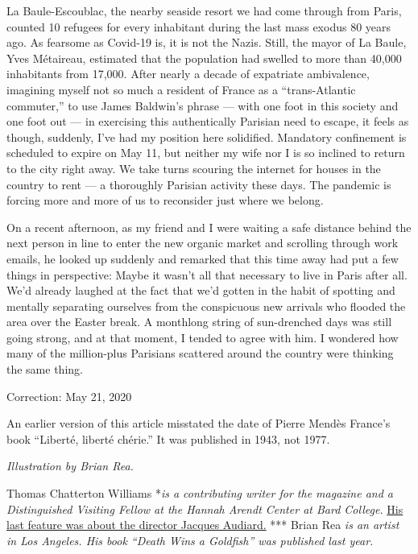 La Baule-Escoublac, the nearby seaside resort we had come through from
Paris, counted 10 refugees for every inhabitant during the last mass
exodus 80 years ago. As fearsome as Covid-19 is, it is not the Nazis.
Still, the mayor of La Baule, Yves Métaireau, estimated that the
population had swelled to more than 40,000 inhabitants from 17,000.
After nearly a decade of expatriate ambivalence, imagining myself not so
much a resident of France as a ``trans-Atlantic commuter,'' to use James
Baldwin's phrase --- with one foot in this society and one foot out ---
in exercising this authentically Parisian need to escape, it feels as
though, suddenly, I've had my position here solidified. Mandatory
confinement is scheduled to expire on May 11, but neither my wife nor I
is so inclined to return to the city right away. We take turns scouring
the internet for houses in the country to rent --- a thoroughly Parisian
activity these days. The pandemic is forcing more and more of us to
reconsider just where we belong.

On a recent afternoon, as my friend and I were waiting a safe distance
behind the next person in line to enter the new organic market and
scrolling through work emails, he looked up suddenly and remarked that
this time away had put a few things in perspective: Maybe it wasn't all
that necessary to live in Paris after all. We'd already laughed at the
fact that we'd gotten in the habit of spotting and mentally separating
ourselves from the conspicuous new arrivals who flooded the area over
the Easter break. A monthlong string of sun-drenched days was still
going strong, and at that moment, I tended to agree with him. I wondered
how many of the million-plus Parisians scattered around the country were
thinking the same thing.

Correction: May 21, 2020

An earlier version of this article misstated the date of Pierre Mendès
France's book ``Liberté, liberté chérie.'' It was published in 1943, not
1977.

\emph{Illustration by Brian Rea.}

Thomas Chatterton Williams *\emph{is a contributing writer for the
magazine and a Distinguished Visiting Fellow at the Hannah Arendt Center
at Bard College.}
\href{https://www.nytimes3xbfgragh.onion/2018/10/11/magazine/jacques-audiard-french-scorsese-sisters-brothers.html}{His
last feature was about the director Jacques Audiard.} *** Brian Rea
\emph{is an artist in Los Angeles. His book ``Death Wins a Goldfish''
was published last year.}

